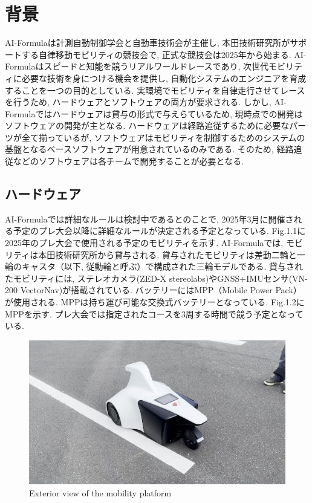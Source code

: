 
\section{背景}
AI-Formulaは計測自動制御学会と自動車技術会が主催し, 本田技術研究所がサポートする自律移動モビリティの競技会で, 正式な競技会は2025年から始まる. \cite{AI-Formula}
AI-Formulaはスピードと知能を競うリアルワールドレースであり, 次世代モビリティに必要な技術を身につける機会を提供し, 自動化システムのエンジニアを育成することを一つの目的としている.
%
実環境でモビリティを自律走行させてレースを行うため, ハードウェアとソフトウェアの両方が要求される.
しかし, AI-Formulaではハードウェアは貸与の形式で与えらているため, 現時点での開発はソフトウェアの開発が主となる.
ハードウェアは経路追従するために必要なパーツが全て揃っているが, ソフトウェアはモビリティを制御するためのシステムの基盤となるベースソフトウェアが用意されているのみである. \cite{AI-Formula-support}
そのため, 経路追従などのソフトウェアは各チームで開発することが必要となる.
\cite{AIFormula-chibakou} \cite{AIFormula-repo}


\subsection{ハードウェア}
AI-Formulaでは詳細なルールは検討中であるとのことで, 2025年3月に開催される予定のプレ大会以降に詳細なルールが決定される予定となっている.
Fig.1.1に2025年のプレ大会で使用される予定のモビリティを示す.
AI-Formulaでは, モビリティは本田技術研究所から貸与される.
貸与されたモビリティは差動二輪と一輪のキャスタ（以下, 従動輪と呼ぶ）で構成された三輪モデルである.
貸与されたモビリティには, ステレオカメラ(ZED-X stereolabs)やGNSS+IMUセンサ(VN-200 VectorNav)が搭載されている.
バッテリーにはMPP（Mobile Power Pack）が使用される. MPPは持ち運び可能な交換式バッテリーとなっている. Fig.1.2にMPPを示す.
プレ大会では指定されたコースを3周する時間で競う予定となっている.

\begin{figure}[H]
  \centering
 \includegraphics[keepaspectratio, scale=0.6]
      {images/ExteriorViewOfTheMobilityPlatform.png}
 \caption{Exterior view of the mobility platform}
 \label{fig:robot view}
\end{figure}

